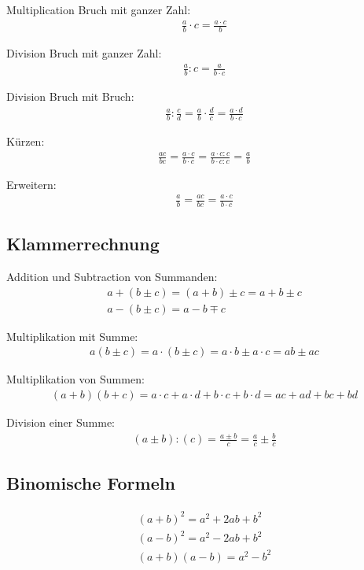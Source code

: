 \documentclass[8pt,a4paper,fleqn]{article}
\begin{document}
Multiplication Bruch mit ganzer Zahl:
\begin{align*}
\frac{a}{b} \cdot c = \frac{a \cdot c}{b} 
\end{align*}

Division Bruch mit ganzer Zahl:
\begin{align*}
\frac{a}{b} : c = \frac{a}{b \cdot c} 
\end{align*}

Division Bruch mit Bruch:
\begin{align*}
\frac{a}{b} : \frac{c}{d} = \frac{a}{b}  \cdot \frac{d}{c} = \frac{a \cdot d }{b \cdot c} 
\end{align*}

Kürzen:
\begin{align*}
\frac{ac}{bc} = \frac{a \cdot c}{b \cdot c} =  \frac{a \cdot c : c }{b \cdot c : c} =\frac{a}{b} 
\end{align*}

Erweitern:
\begin{align*}
\frac{a}{b} =  \frac{ac}{bc} =   \frac{a \cdot c}{b \cdot c} 
\end{align*}

\subsection{Klammerrechnung}

Addition und Subtraction von Summanden:
\begin{align*}
 a + (b \pm c) = (a + b) \pm c = a + b \pm c \\
 a - (b \pm c) =  a - b \mp c
\end{align*}

Multiplikation mit Summe:
\begin{align*}
 a (b \pm c) =  a \cdot (b \pm c) = a \cdot b \pm a \cdot c = ab \pm ac
\end{align*}

Multiplikation von Summen:
\begin{align*}
 (a+b)(b+c) = a \cdot c +a \cdot d +b \cdot c +b \cdot d = ac +ad +bc +bd 
\end{align*}

Division einer Summe:
\begin{align*}
 (a \pm b):(c) = \frac{a \pm b}{c} = \frac{a}{c} \pm  \frac{b}{c} 
\end{align*}

\subsection{Binomische Formeln}
\begin{align*}
(a+b)^ 2 = a^ 2 + 2ab + b^2\\
(a-b)^ 2 =  a^ 2 - 2ab + b^2 \\
(a+b)(a-b) = a^ 2 - b^2
\end{align*}
 
\end{document}
